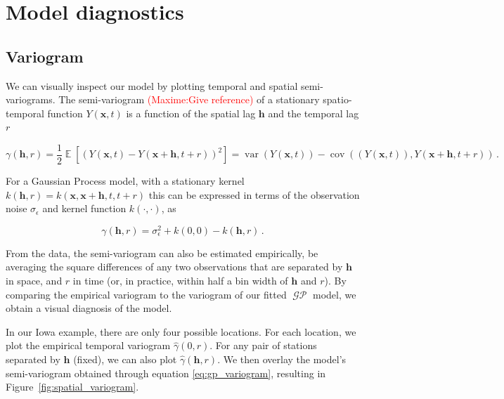 \documentclass[letter]{article}
\newcommand \tcr[1]{\textcolor{red}{(#1)}}
\newcommand{\genericdel}[3]{%
      \left#1#3\right#2
    }
\newcommand{\del}[1]{\genericdel(){#1}}
\newcommand{\sbr}[1]{\genericdel[]{#1}}
\DeclareMathOperator{\E}{\mathbb{E}}
\DeclareMathOperator{\cov}{{cov}}
\DeclareMathOperator{\var}{{var}}
\DeclareMathOperator{\GP}{\mathcal{GP}}
\newcommand{\xvec}{\mathbold{x}}
\newcommand{\hvec}{\mathbold{h}}
\newcommand{\sigman}{\sigma_{\epsilon}}
\begin{document}
        \section{Model diagnostics}\label{model-diagnostics}

\subsection{Variogram}\label{variogram}

We can visually inspect our model by plotting temporal and spatial semi-variograms. The semi-variogram \tcr{Maxime:Give reference} of a stationary spatio-temporal function \(Y(\xvec,t)\) is a function of the spatial lag \(\hvec\) and the temporal lag \(r\)

\begin{equation}
    \gamma\del{\hvec,r} = \frac{1}{2} \E\sbr{\del{Y\del{\xvec,t}-Y\del{\xvec+\hvec,t+r}}^2} = \var\del{ Y\del{\xvec,t}} - \cov\del{ \del{Y\del{\xvec,t}} , Y\del{\xvec+\hvec,t+r}}\,.
\end{equation}

For a Gaussian Process model, with a stationary kernel \(k(\hvec,r)=k(\xvec,\xvec+\hvec,t,t+r)\) this can be expressed in terms of the observation noise \(\sigman\) and kernel function \(k(\cdot,\cdot)\), as

\begin{equation}
    \label{eq:gp_variogram}
    \gamma\del{\hvec,r} = \sigman^2 + k\del{0,0} - k(\hvec,r)\,.
\end{equation}

From the data, the semi-variogram can also be estimated empirically, be averaging the square differences of any two observations that are separated by \(\hvec\) in space, and \(r\) in time (or, in practice, within half a bin width of \(\hvec\) and \(r\)). By comparing the empirical variogram to the variogram of our fitted \(\GP\) model, we obtain a visual diagnosis of the model.

In our Iowa example, there are only four possible locations. For each location, we plot the empirical temporal variogram \(\widehat\gamma\del{0,r}\). For any pair of stations separated by \(\hvec\) (fixed), we can also plot \(\widehat\gamma\del{\hvec,r}\). We then overlay the model's semi-variogram obtained through equation \eqref{eq:gp_variogram}, resulting in Figure~\ref{fig:spatial_variogram}.
\end{document}
